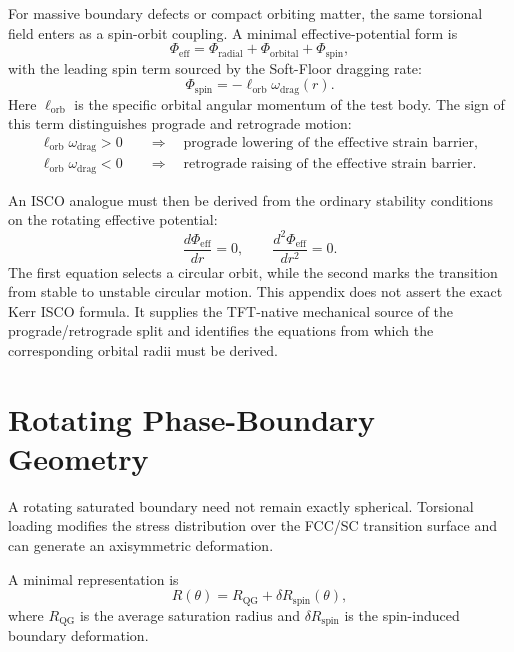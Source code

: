 For massive boundary defects or compact orbiting matter, the same torsional field enters as a spin-orbit coupling. A minimal effective-potential form is
\begin{equation}
    \Phi_{\mathrm{eff}}
    =
    \Phi_{\mathrm{radial}}
    +
    \Phi_{\mathrm{orbital}}
    +
    \Phi_{\mathrm{spin}},
\end{equation}
with the leading spin term sourced by the Soft-Floor dragging rate:
\begin{equation}
    \Phi_{\mathrm{spin}}
    =
    -
    \ell_{\mathrm{orb}}
    \omega_{\mathrm{drag}}(r).
\end{equation}
Here \(\ell_{\mathrm{orb}}\) is the specific orbital angular momentum of the test body. The sign of this term distinguishes prograde and retrograde motion:
\begin{align}
    \ell_{\mathrm{orb}}\omega_{\mathrm{drag}}>0
    &\quad\Rightarrow\quad
    \text{prograde lowering of the effective strain barrier},
    \\
    \ell_{\mathrm{orb}}\omega_{\mathrm{drag}}<0
    &\quad\Rightarrow\quad
    \text{retrograde raising of the effective strain barrier}.
\end{align}

An ISCO analogue must then be derived from the ordinary stability conditions on the rotating effective potential:
\begin{equation}
    \frac{d\Phi_{\mathrm{eff}}}{dr}=0,
    \qquad
    \frac{d^2\Phi_{\mathrm{eff}}}{dr^2}=0 .
\end{equation}
The first equation selects a circular orbit, while the second marks the transition from stable to unstable circular motion. This appendix does not assert the exact Kerr ISCO formula. It supplies the TFT-native mechanical source of the prograde/retrograde split and identifies the equations from which the corresponding orbital radii must be derived.


\section{Rotating Phase-Boundary Geometry}
A rotating saturated boundary need not remain exactly spherical. Torsional loading modifies the stress distribution over the FCC/SC transition surface and can generate an axisymmetric deformation.

A minimal representation is
\begin{equation}
    R(\theta) = R_{\mathrm{QG}} + \delta R_{\mathrm{spin}}(\theta),
\end{equation}
where $R_{\mathrm{QG}}$ is the average saturation radius and $\delta R_{\mathrm{spin}}$ is the spin-induced boundary deformation.

